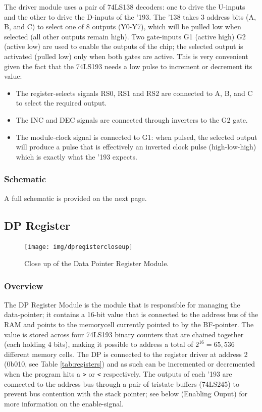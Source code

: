 The driver module uses a pair of 74LS138 decoders: one to drive the U-inputs and the other to drive the D-inputs of the '193. The '138 takes 3 address bits (A, B, and C) to select one of 8 outputs (Y0-Y7), which will be pulled low when selected (all other outputs remain high). Two gate-inputs G1 (active high) G2 (active low) are used to enable the outputs of the chip; the selected output is activated (pulled low) only when both gates are active. This is very convenient given the fact that the 74LS193 needs a low pulse to increment or decrement its value:
\begin{itemize}
\item The register-selects signals RS0, RS1 and RS2 are connected to A, B, and C to select the required output.
\item The INC and DEC signals are connected through inverters to the G2 gate.
\item The module-clock signal is connected to G1: when pulsed, the selected output will produce a pulse that is effectively an inverted clock pulse (high-low-high) which is exactly what the '193 expects. 
\end{itemize}

\subsubsection{Schematic}
A full schematic is provided on the next page.



\subsection{DP Register} \label{sec:implementation:dp}
\begin{figure}[H]
  \centering
  \texttt{[image: img/dpregistercloseup]}
  \caption{Close up of the Data Pointer Register Module.}
  \label{fig:dpregcloseup}
\end{figure}

\subsubsection{Overview}
The DP Register Module is the module that is responsible for managing the data-pointer; it contains a 16-bit value that is connected to the address bus of the RAM and points to the memorycell currently pointed to by the BF-pointer. The value is stored across four 74LS193 binary counters that are chained together (each holding 4 bits), making it possible to address a total of $2^{16}=65,536$ different memory cells. The DP is connected to the register driver at address 2 (0b010, see Table \ref{tab:registers}) and as such can be incremented or decremented when the program hits a \texttt{>} or \texttt{<} respectively. The outputs of each '193 are connected to the address bus through a pair of tristate buffers (74LS245) to prevent bus contention with the stack pointer; see below (Enabling Ouput) for more information on the enable-signal.

